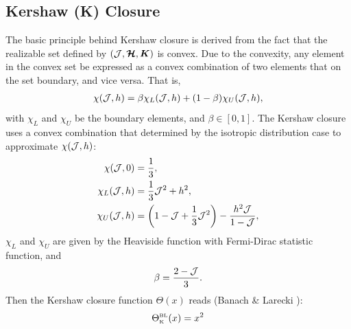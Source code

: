 \subsection{Kershaw (K) Closure}

The basic principle behind Kershaw closure is derived from the fact that the realizable set defined by $(\mathcal{J}, \boldsymbol{\mathcal{H}}, \boldsymbol{K})$ is convex.
Due to the convexity, any element in the convex set be expressed as a convex combination of two elements that on the set boundary, and vice versa.
That is,
\begin{align}
 \chi(\mathcal{J},h) = \beta  \chi_{L}(\mathcal{J},h) + (1-\beta) \chi_{U}(\mathcal{J},h),
\end{align}
with $\chi_{L}$ and $\chi_{U}$ be the boundary elements, and $\beta \in [0,1]$. 
The Kershaw closure uses a convex combination that determined by the isotropic distribution case to approximate $\chi(\mathcal{J},h)$:
\begin{align}
 \chi(\mathcal{J},0)  &= \dfrac{1}{3},\\
\chi_{L}(\mathcal{J},h) & = \dfrac{1}{3}\mathcal{J}^2 + h^2, \\
\chi_{U}(\mathcal{J},h) & = \left( 1 - \mathcal{J} + \dfrac{1}{3}\mathcal{J}^2 \right) - \dfrac{h^2 \mathcal{J}}{1-\mathcal{J}},
\end{align}
$\chi_{L}$ and $\chi_{U}$ are given by the Heaviside function with Fermi-Dirac statistic function, and
\begin{align}
\beta = \dfrac{2 - \mathcal{J}}{3}.
\end{align}
Then the Kershaw closure function $\Theta(x)$ reads (Banach \& Larecki \cite{banachLarecki_2017a}):
\begin{equation}
  \Theta_{\mbox{\tiny K}}^{\mbox{\tiny BL}}(x)=x^{2}
\end{equation}

